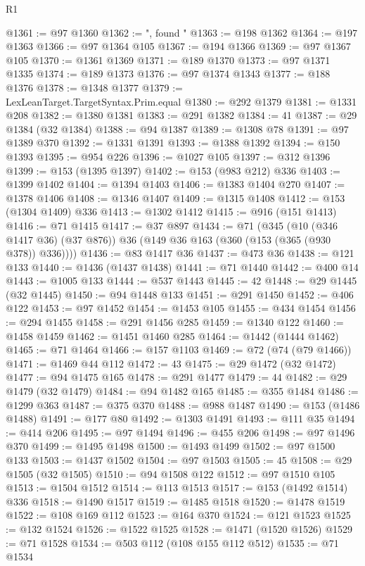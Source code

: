 \begin{lexlean}{R1}
\begin{coremodule}
{{{{{{{{{{{{{{{{{{{{{{{{{{{{{{{{{{{{{{{{{{{{{{{{{{{{{{{{{{{{{{{{{{{{{{{{{{{{{{{{{{{{{{{{{{{{{{{{{{{{{{{{{{{{{{{{{{{{{{{{{{{{{{{{{{{{{{{{{{{{{{{{{{{{{{{{{{{{{{{{{{{{{{{{{{{{{{{{{{{{{{{{{{@1361 := @97 @1360
@1362 := ", found "
@1363 := @198 @1362
@1364 := @197 @1363
@1366 := @97 @1364 @105
@1367 := @194 @1366
@1369 := @97 @1367 @105
@1370 := @1361 @1369
@1371 := @189 @1370
@1373 := @97 @1371 @1335
@1374 := @189 @1373
@1376 := @97 @1374 @1343
@1377 := @188 @1376
@1378 := @1348 @1377
@1379 := LexLeanTarget.TargetSyntax.Prim.equal
@1380 := @292 @1379
@1381 := @1331 @208
@1382 := @1380 @1381
@1383 := @291 @1382
@1384 := 41
@1387 := @29 @1384 (@32 @1384)
@1388 := @94 @1387
@1389 := @1308 @78
@1391 := @97 @1389 @370
@1392 := @1331 @1391
@1393 := @1388 @1392
@1394 := @150 @1393
@1395 := @954 @226
@1396 := @1027 @105
@1397 := @312 @1396
@1399 := @153 (@1395 @1397)
@1402 := @153 (@983 @212) @336
@1403 := @1399 @1402
@1404 := @1394 @1403
@1406 := @1383 @1404 @270
@1407 := @1378 @1406
@1408 := @1346 @1407
@1409 := @1315 @1408
@1412 := @153 (@1304 @1409) @336
@1413 := @1302 @1412
@1415 := @916 (@151 @1413)
@1416 := @71 @1415
@1417 := @37 @897
@1434 := @71
    (@345
      (@10 (@346 @1417 @36) (@37 @876))
      @36
      (@149 @36 @163 (@360 (@153 (@365 (@930 @378)) @336))))
@1436 := @83 @1417 @36
@1437 := @473 @36
@1438 := @121 @133
@1440 := @1436 (@1437 @1438)
@1441 := @71 @1440
@1442 := @400 @14
@1443 := @1005 @133
@1444 := @537 @1443
@1445 := 42
@1448 := @29 @1445 (@32 @1445)
@1450 := @94 @1448 @133
@1451 := @291 @1450
@1452 := @406 @122
@1453 := @97 @1452
@1454 := @1453 @105
@1455 := @434 @1454
@1456 := @294 @1455
@1458 := @291 @1456 @285
@1459 := @1340 @122
@1460 := @1458 @1459
@1462 := @1451 @1460 @285
@1464 := @1442 (@1444 @1462)
@1465 := @71 @1464
@1466 := @157 @1103
@1469 := @72 (@74 (@79 @1466))
@1471 := @1469 @44 @112
@1472 := 43
@1475 := @29 @1472 (@32 @1472)
@1477 := @94 @1475 @165
@1478 := @291 @1477
@1479 := 44
@1482 := @29 @1479 (@32 @1479)
@1484 := @94 @1482 @165
@1485 := @355 @1484
@1486 := @1299 @363
@1487 := @375 @370
@1488 := @988 @1487
@1490 := @153 (@1486 @1488)
@1491 := @177 @80
@1492 := @1303 @1491
@1493 := @111 @35
@1494 := @414 @206
@1495 := @97 @1494
@1496 := @455 @206
@1498 := @97 @1496 @370
@1499 := @1495 @1498
@1500 := @1493 @1499
@1502 := @97 @1500 @133
@1503 := @1437 @1502
@1504 := @97 @1503
@1505 := 45
@1508 := @29 @1505 (@32 @1505)
@1510 := @94 @1508 @122
@1512 := @97 @1510 @105
@1513 := @1504 @1512
@1514 := @113 @1513
@1517 := @153 (@1492 @1514) @336
@1518 := @1490 @1517
@1519 := @1485 @1518
@1520 := @1478 @1519
@1522 := @108 @169 @112
@1523 := @164 @370
@1524 := @121 @1523
@1525 := @132 @1524
@1526 := @1522 @1525
@1528 := @1471 (@1520 @1526)
@1529 := @71 @1528
@1534 := @503 @112 (@108 @155 @112 @512)
@1535 := @71 @1534
}}}}}}}}}}}}}}}}}}}}}}}}}}}}}}}}}}}}}}}}}}}}}}}}}}}}}}}}}}}}}}}}}}}}}}}}}}}}}}}}}}}}}}}}}}}}}}}}}}}}}}}}}}}}}}}}}}}}}}}}}}}}}}}}}}}}}}}}}}}}}}}}}}}}}}}}}}}}}}}}}}}}}}}}}}}}}}}}}}}}}}}}}}
\end{coremodule}
\end{lexlean}
